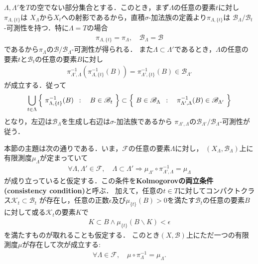 	\begin{prf}
		$\Lambda,\Lambda'$を$T$の空でない部分集合とする．このとき，まず$\Lambda$の任意の要素$t$に対し$\pi_{\Lambda,\{t\}}$は
		$X_\Lambda$から$X_t$への射影であるから，直積$\sigma$-加法族の定義より$\pi_{\Lambda,\{t\}}$は
		$\mathscr{B}_\Lambda/\mathscr{B}_t$-可測性を持つ．特に$\Lambda=T$の場合
		\begin{align}
			\pi_{\Lambda,\{t\}} = \pi_\Lambda,\quad \mathscr{B}_\Lambda = \mathscr{B}
		\end{align}
		であるから$\pi_\Lambda$の$\mathscr{B}/\mathscr{B}_\Lambda$-可測性が得られる．
		また$\Lambda \subset \Lambda'$であるとき，$\Lambda$の任意の要素$t$と$\mathscr{B}_t$の任意の要素$B$に対し
		\begin{align}
			\pi_{\Lambda',\Lambda}^{-1}\left(\pi_{\Lambda,\{t\}}^{-1}(B)\right)
			= \pi_{\Lambda',\{t\}}^{-1}(B) \in \mathscr{B}_{\Lambda'}
		\end{align}
		が成立する．従って
		\begin{align}
			\bigcup_{t\in\Lambda} \left\{\ \pi_{\Lambda,\{t\}}^{-1}(B)\ \, : \quad B \in \mathscr{B}_t\ \right\}
			\subset \left\{\ B \in \mathscr{B}_\Lambda\ \, : \quad \pi_{\Lambda',\Lambda}^{-1}(B) \in \mathscr{B}_{\Lambda'}\ \right\}
		\end{align}
		となり，左辺は$\mathscr{B}_\Lambda$を生成し右辺は$\sigma$-加法族であるから
		$\pi_{\Lambda',\Lambda}$の$\mathscr{B}_{\Lambda'}/\mathscr{B}_\Lambda$-可測性が従う．
		\QED
	\end{prf}
	
	本節の主題は次の通りである．いま，$\mathscr{F}$の任意の要素$\Lambda$に対し，
	$(X_\Lambda,\mathscr{B}_\Lambda)$上に有限測度$\mu_\Lambda$が定まっていて
	\begin{align}
		\forall \Lambda,\Lambda' \in \mathscr{F},\quad
		\Lambda \subset \Lambda' \Longrightarrow
		\mu_{\Lambda'} \circ \pi_{\Lambda',\Lambda}^{-1}
		= \mu_\Lambda
	\end{align}
	が成り立っていると仮定する．この条件を{\bf Kolmogorovの両立条件}
	{\bf (consistency condition)}と呼ぶ．
	加えて，任意の$t \in T$に対してコンパクトクラス$\mathcal{K}_t \subset \mathscr{B}_t$
	が存在し，任意の正数$\epsilon$及び$\mu_{\{t\}}(B) > 0$を満たす$\mathscr{B}_t$の任意の要素$B$
	に対して或る$\mathcal{K}_t$の要素$K$で
	\begin{align}
		K \subset B \wedge \mu_{\{t\}}(B \backslash K) < \epsilon
	\end{align}
	を満たすものが取れることも仮定する．
	このとき$(X,\mathscr{B})$上にただ一つの有限測度$\mu$が存在して次が成立する:
	\begin{align}
		\forall \Lambda \in \mathscr{F},\quad 
		\mu \circ \pi_{\Lambda}^{-1} = \mu_\Lambda.
	\end{align}
	
